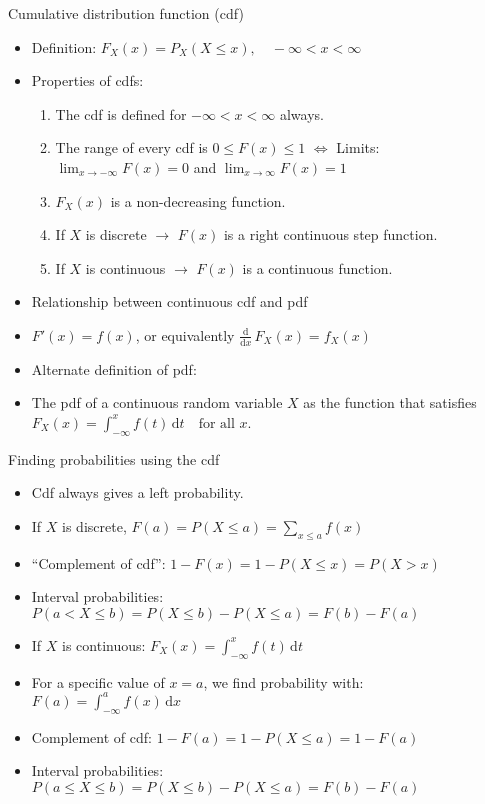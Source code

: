 \documentclass{article}
\newcommand{\integral}[4]{\displaystyle \int_{#1}^{#2} #3 \,\mathrm{d} #4}		%
\newcommand{\ddx}[1]{\frac{\mathrm{d}}{\mathrm{d} #1}\,}		%
\begin{document}
Cumulative distribution function (cdf)
\begin{itemize}
    \item Definition: $F_X(x) = P_X(X \le x),\quad -\infty < x < \infty$
    \item Properties of cdfs:
    \begin{enumerate}
        \item The cdf is defined for $-\infty < x < \infty$ always.
        \item The range of every cdf is $0 \le F(x) \le 1$ $\Longleftrightarrow$ Limits: $\displaystyle \lim_{x \to -\infty} F(x) = 0$ \hspace{10pt} and \hspace{10pt} $\displaystyle \lim_{x \to \infty} F(x) = 1$
        \item $F_X(x)$ is a non-decreasing function.
        \item If $X$ is discrete $\rightarrow$ $F(x)$ is a right continuous step function.
        \item[] If $X$ is continuous $\rightarrow$ $F(x)$ is a continuous function.
    \end{enumerate}
    \item Relationship between continuous cdf and pdf
    \item[] $F'(x) = f(x)$, or equivalently $\ddx{x} F_X(x) = f_X(x)$
    \item Alternate definition of pdf:
    \item[] The pdf of a continuous random variable $X$ as the function that satisfies $F_X(x) = \integral{-\infty}{x}{f(t)}{t} \quad \text{for all } x$.
\end{itemize}\vspace{50pt}

Finding probabilities using the cdf
\begin{itemize}
    \item Cdf always gives a left probability.
    \item If $X$ is discrete, $\displaystyle F(a) = P(X \le a) = \sum_{x \le a} f(x)$
    \item[] ``Complement of cdf'': $1 - F(x) = 1 -  P(X \le x) = P(X > x)$
    \item[] Interval probabilities: $P(a < X \le b) = P(X \le b) - P(X \le a) = F(b) - F(a)$
    \item If $X$ is continuous: $F_X(x) = \integral{-\infty}{x}{f(t)}{t}$
    \item[] For a specific value of $x = a$, we find probability with: $F(a) = \integral{-\infty}{a}{f(x)}{x}$
    \item[] Complement of cdf: $1 - F(a) = 1 - P(X \le a) = 1 - F(a)$
    \item[] Interval probabilities: $P(a \le X \le b) = P(X \le b) - P(X \le a) = F(b) - F(a)$
\end{itemize}\vspace{50pt}
\end{document}
